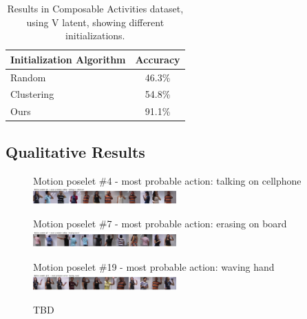 \begin{table}[tb]
\footnotesize
\centering
\begin{tabular}{|l|c|}
\hline
\textbf{Initialization Algorithm} & \textbf{Accuracy}\\
\hline
Random   & 46.3\% \\
Clustering   & 54.8\% \\
Ours   & 91.1\% \\
\hline
\end{tabular}
\caption{
\footnotesize
Results in Composable Activities dataset, using V latent, showing different initializations. }
\label{tab:initialization}
\vspace{-3mm}
\end{table}

\subsection{Qualitative Results}

\begin{figure}[th]
\begin{center}
\scriptsize
 Motion poselet \#4 - most probable action: talking on cellphone\\
 \includegraphics[trim=0 0 0 0.35cm, clip, width=0.49\textwidth]{Fig/poselets1}

 Motion poselet \#7 - most probable action: erasing on board\\
 \includegraphics[trim=0 0 0 0.35cm, clip, width=0.49\textwidth]{Fig/poselets2}

 Motion poselet \#19 - most probable action: waving hand\\
 \includegraphics[trim=0 0 0 0.35cm, clip, width=0.49\textwidth]{Fig/poselets3}
\end{center}
\caption{TBD}
\label{fig:poselets_img}
\end{figure}


